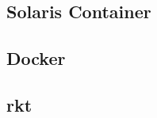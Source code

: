 \subsection{Solaris Container}
\label{sec:solariscontainer}

	







\subsection{Docker}
\label{sec:Docker}




\subsection{rkt}
\label{sec:rkt}

